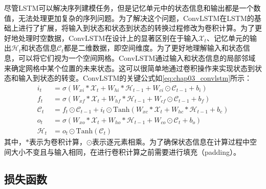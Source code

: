 尽管LSTM可以解决序列建模任务，但是记忆单元中的状态信息和输出都是一个数值，无法处理更加复杂的序列问题。为了解决这个问题，ConvLSTM在LSTM的基础上进行了扩展，将输入到状态和状态到状态的转换过程修改为卷积计算。为了更好地处理时空数据，ConvLSTM在设计上的显著区别在于输入\(\mathcal{X}_t\)、记忆单元的输出\(\mathcal{H}_t\)和状态信息\(\mathcal{C}_t\)都是二维数据，即空间维度。为了更好地理解输入和状态信息，可以将它们视为一个空间网格。ConvLSTM通过输入和状态信息的局部邻域来确定网格中某个位置的未来状态。这可以很简单地通过卷积操作来实现状态到状态和输入到状态的转变。ConvLSTM的关键公式如\ref{eq:chap03_convlstm}所示：
\begin{equation}
  \begin{aligned}
    i_t           & = \sigma(W_{xi} \ast \mathcal{X}_t + W_{hi} \ast \mathcal{H}_{t-1} + W_{ci} \odot \mathcal{C}_{t-1} + b_i)          \\
    f_t           & = \sigma(W_{xf} \ast \mathcal{X}_t + W_{hf} \ast \mathcal{H}_{t-1} + W_{cf} \odot \mathcal{C}_{t-1} + b_f)          \\
    \mathcal{C}_t & = f_t \odot \mathcal{C}_{t-1} + i_t \odot \text{Tanh}(W_{xc} \ast \mathcal{X}_t + W_{hc} * \mathcal{H}_{t-1} + b_c) \\
    o_t           & = \sigma(W_{xo} \ast \mathcal{X}_t + W_{ho} \ast \mathcal{H}_{t-1} + W_{co} \odot \mathcal{C}_{t} + b_o)            \\
    \mathcal{H}_t & = o_t \odot \text{Tanh}(\mathcal{C}_t)
  \end{aligned}
  \label{eq:chap03_convlstm}
\end{equation}
其中，\(\ast\)表示为卷积计算，\(\odot\)表示逐元素相乘。为了确保状态信息在计算过程中空间大小不变且与输入相同，在进行卷积计算之前需要进行填充（padding）。

\subsection{损失函数}

